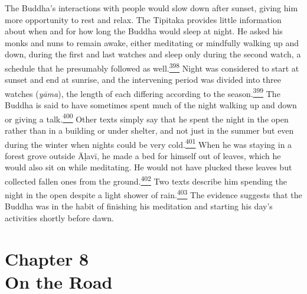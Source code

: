The Buddha's interactions with people would slow down after sunset,
giving him more opportunity to rest and relax. The Tipitaka provides
little information about when and for how long the Buddha would sleep at
night. He asked his monks and nuns to remain awake, either meditating or
mindfully walking up and down, during the first and last watches and
sleep only during the second watch, a schedule that he presumably
followed as
well.\label{footprints_split_011.html_fnref398}\hyperref[footprints_split_024.htmlux5cux23fn398]{\textsuperscript{398}}
Night was considered to start at sunset and end at sunrise, and the
intervening period was divided into three watches (\emph{yāma}), the
length of each differing according to the
season.\label{footprints_split_011.html_fnref399}\hyperref[footprints_split_024.htmlux5cux23fn399]{\textsuperscript{399}}
The Buddha is said to have sometimes spent much of the night walking up
and down or giving a
talk.\label{footprints_split_011.html_fnref400}\hyperref[footprints_split_024.htmlux5cux23fn400]{\textsuperscript{400}}
Other texts simply say that he spent the night in the open rather than
in a building or under shelter, and not just in the summer but even
during the winter when nights could be very
cold.\label{footprints_split_011.html_fnref401}\hyperref[footprints_split_024.htmlux5cux23fn401]{\textsuperscript{401}}
When he was staying in a forest grove outside Āḷavī, he made a bed for
himself out of leaves, which he would also sit on while meditating. He
would not have plucked these leaves but collected fallen ones from the
ground.\label{footprints_split_011.html_fnref402}\hyperref[footprints_split_024.htmlux5cux23fn402]{\textsuperscript{402}}
Two texts describe him spending the night in the open despite a light
shower of
rain.\label{footprints_split_011.html_fnref403}\hyperref[footprints_split_024.htmlux5cux23fn403]{\textsuperscript{403}}
The evidence suggests that the Buddha was in the habit of finishing his
meditation and starting his day's activities shortly before dawn.

\label{footprints_split_011.html_calibre_pb_23}

\label{footprints_split_012.html}{}

\section{\texorpdfstring{{Chapter 8}\\
On the
Road}{Chapter 8 On the Road}}\label{footprints_split_012.html_TOCTarget8}

